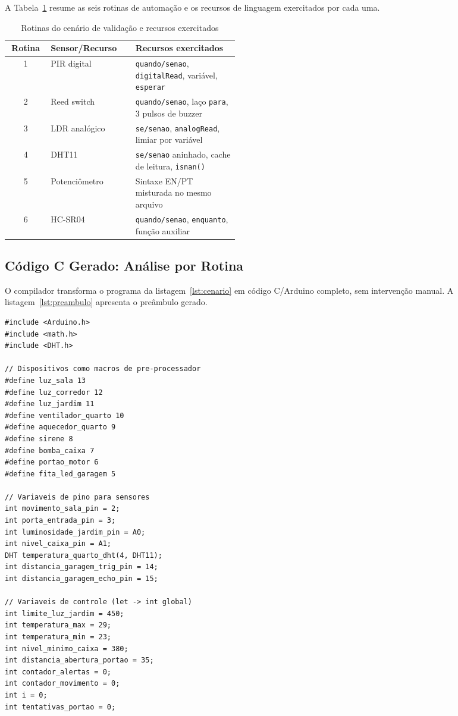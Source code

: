 \documentclass[conference]{IEEEtran}
\begin{document}
A Tabela~\ref{tab:rotinas} resume as seis rotinas de automação e os recursos
de linguagem exercitados por cada uma.

\begin{table}[htbp]
\caption{Rotinas do cenário de validação e recursos exercitados}
\label{tab:rotinas}
\centering
\begin{tabular}{clp{0.45\linewidth}}
\toprule
\textbf{Rotina} & \textbf{Sensor/Recurso} & \textbf{Recursos exercitados} \\
\midrule
1 & PIR digital & \texttt{quando/senao}, \texttt{digitalRead}, variável, \texttt{esperar} \\
2 & Reed switch & \texttt{quando/senao}, laço \texttt{para}, 3 pulsos de buzzer \\
3 & LDR analógico & \texttt{se/senao}, \texttt{analogRead}, limiar por variável \\
4 & DHT11 & \texttt{se/senao} aninhado, cache de leitura, \texttt{isnan()} \\
5 & Potenciômetro & Sintaxe EN/PT misturada no mesmo arquivo \\
6 & HC-SR04 & \texttt{quando/senao}, \texttt{enquanto}, função auxiliar \\
\bottomrule
\end{tabular}
\end{table}

\subsection{Código C Gerado: Análise por Rotina}
\label{subsec:codegen_analise}

O compilador transforma o programa da listagem~\ref{lst:cenario} em código
C/Arduino completo, sem intervenção manual. A listagem~\ref{lst:preambulo}
apresenta o preâmbulo gerado.

\begin{lstlisting}[style=csmall,caption={Preâmbulo e declarações globais gerados.},label={lst:preambulo}]
#include <Arduino.h>
#include <math.h>
#include <DHT.h>

// Dispositivos como macros de pre-processador
#define luz_sala 13
#define luz_corredor 12
#define luz_jardim 11
#define ventilador_quarto 10
#define aquecedor_quarto 9
#define sirene 8
#define bomba_caixa 7
#define portao_motor 6
#define fita_led_garagem 5

// Variaveis de pino para sensores
int movimento_sala_pin = 2;
int porta_entrada_pin = 3;
int luminosidade_jardim_pin = A0;
int nivel_caixa_pin = A1;
DHT temperatura_quarto_dht(4, DHT11);
int distancia_garagem_trig_pin = 14;
int distancia_garagem_echo_pin = 15;

// Variaveis de controle (let -> int global)
int limite_luz_jardim = 450;
int temperatura_max = 29;
int temperatura_min = 23;
int nivel_minimo_caixa = 380;
int distancia_abertura_portao = 35;
int contador_alertas = 0;
int contador_movimento = 0;
int i = 0;
int tentativas_portao = 0;
\end{lstlisting}
\end{document}
